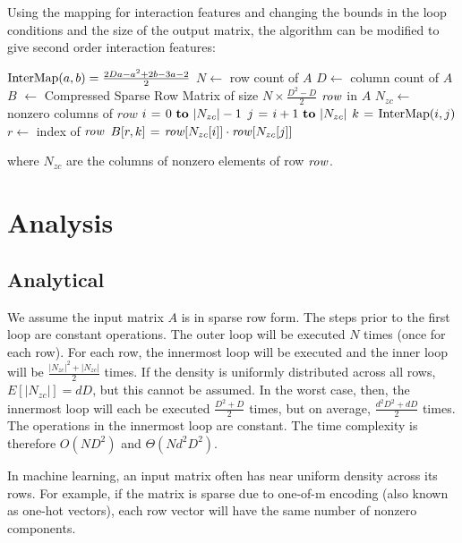 \documentclass[11pt,onecolumn]{article}
\begin{document}
Using the mapping for interaction features and changing the bounds in the loop conditions and the size of the output matrix, 
the algorithm can be modified to give second order interaction features:

\begin{codebox}
    \zi $\func{InterMap}(a, b) = \frac{2Da-a^2+2b-3a-2}{2}$
    \zi $N \gets$ row count of $A$
    \zi $D \gets$ column count of $A$
    \zi $B$ $\gets$ Compressed Sparse Row Matrix of size $N \times \frac{D^2-D}{2}$
    \zi \For $\id{row}$ in $A$ \Do
    \zi     $N_{zc} \gets$ nonzero columns of $row$
    \zi     \For $i \gets 0 \To |N_{zc}|-1$ \Do
    \zi         \For $j \gets i+1 \To |N_{zc}|$ \Do
    \zi             $k \gets \func{InterMap}(i, j)$
    \zi             $r \gets$ index of $\id{row}$
    \zi             $B[r, k] \gets \id{row}[N_{zc}[i]] \cdot \id{row}[N_{zc}[j]]$
                \End
            \End
       	\End
\end{codebox}

where $N_{zc}$ are the columns of nonzero elements of row $\id{row}$.

\section{Analysis}

\subsection{Analytical}
We assume the input matrix $A$ is in sparse row form. The steps prior to the first loop are
constant operations. The outer loop will be executed $N$ times (once for each row). For each row, 
the innermost loop will be executed and the inner loop will be $\frac{|N_{zc}|^2+|N_{zc}|}{2}$ times.
If the density is uniformly distributed across all rows, $E[|N_{zc}|] = dD$, but this cannot be assumed. In the worst case,
then, the innermost loop will each be executed $\frac{D^2+D}{2}$ times, but on average, $\frac{d^2D^2+dD}{2}$ times.
The operations in the innermost loop are constant. The time complexity is therefore $O(ND^2)$ and $\Theta(Nd^2D^2)$.

In machine learning, an input matrix often has near uniform density across its rows.
For example, if the matrix is sparse due to one-of-m encoding (also known as one-hot vectors), each row vector will
have the same number of nonzero components.
\end{document}
